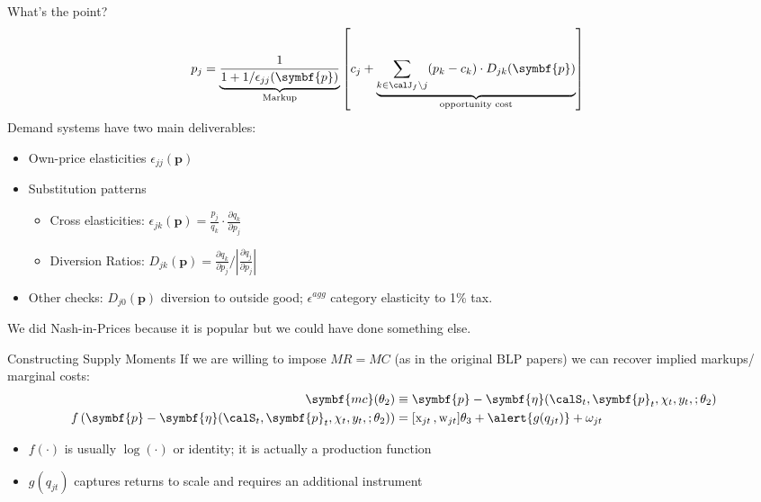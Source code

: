 \begin{frame}{What's the point?}
\begin{align*}
p_j &= \underbrace{\frac{1}{1+1/\epsilon_{jj}(\symbf{p})}}_{\text{Markup}} \left[c_j + \underbrace{\sum_{k \in \calJ_{f} \setminus j}  (p_k-c_k) \cdot  D_{jk} (\symbf{p}) }_{\text{opportunity cost}}\right]
\end{align*}
Demand systems have two main deliverables:
\begin{itemize}
\item Own-price elasticities $\epsilon_{jj}(\symbf{p})$
\item Substitution patterns
\begin{itemize}
\item Cross elasticities: $\epsilon_{jk}(\symbf{p}) = \frac{p_j}{q_k} \cdot \frac{\partial q_k}{\partial p_j}$
\item Diversion Ratios: $D_{jk}(\symbf{p}) = \frac{\partial q_k}{\partial p_j}/|\frac{\partial q_j}{\partial p_j}|$
\end{itemize}
\item Other checks: $D_{j0}(\symbf{p})$ diversion to outside good; $\epsilon^{agg}$ category elasticity to 1\% tax.
\end{itemize}
We did Nash-in-Prices because it is popular but we could have done something else.
\end{frame}









\begin{frame}{Constructing Supply Moments}
If we are willing to impose $MR = MC$ (as in the original BLP papers) we can recover implied markups/ marginal costs:
\begin{align*}
\symbf{mc}(\theta_2)&\equiv \symbf{p}- \symbf{\eta}(\calS_t,\symbf{p}_t,\chi_t, y_t, ;\theta_2) \\
f\left(\symbf{p}- \symbf{\eta}(\calS_t,\symbf{p}_t,\chi_t, y_t, ;\theta_2)  \right) &= [\textrm{x}_{jt} \,, \textrm{w}_{jt}] \theta_3 + \alert{g(q_{jt})} +  \omega_{jt}
\end{align*}
\begin{itemize}
\item $f(\cdot)$ is usually $\log(\cdot)$ or identity; it is actually a \alert{production function}
\item $g(q_{jt})$ captures \alert{returns to scale} and requires an additional \alert{instrument}
\end{itemize}
\end{frame}

